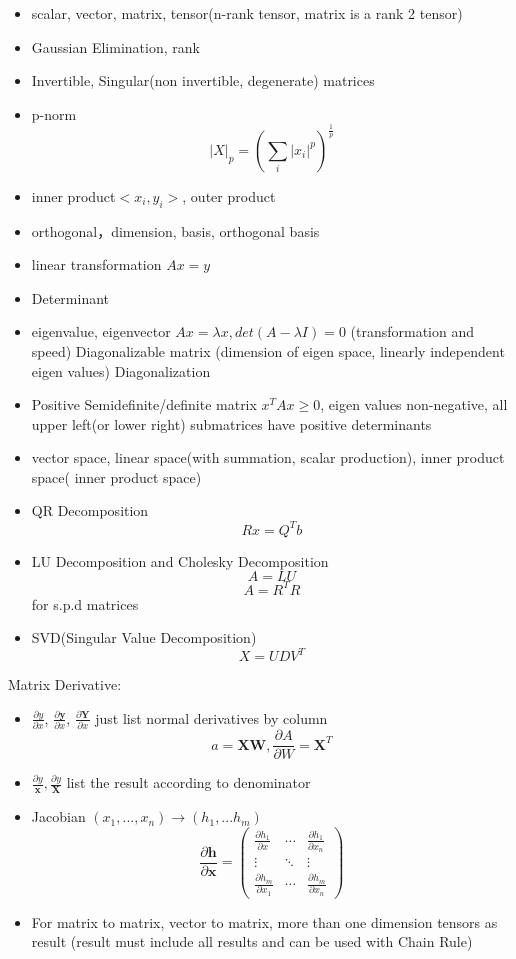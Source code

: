\documentclass[11pt, openany]{book}              %
\begin{document}
\begin{itemize}
    \item scalar, vector, matrix, tensor(n-rank tensor, matrix is a rank 2 tensor) 
    \item Gaussian Elimination, rank
    \item Invertible, Singular(non invertible, degenerate) matrices
    \item p-norm $$|X|_p = (\sum_i |x_i|^p)^{\frac{1}{p}}$$
    \item inner product$<x_i,y_i>$, outer product
    \item orthogonal，dimension, basis, orthogonal basis
    \item linear transformation $Ax = y$
    \item Determinant
    \item eigenvalue, eigenvector $Ax =\lambda x, det(A - \lambda I) = 0$ (transformation and speed)
    	\subitem Diagonalizable matrix (dimension of eigen space, linearly independent eigen values)
    	\subitem Diagonalization
    \item Positive Semidefinite/definite matrix
    	\subitem $x^TAx \geq 0$, eigen values non-negative, all upper left(or lower right) submatrices have positive determinants
    \item vector space, linear space(with summation, scalar production), inner product space( inner product space) 
    \item QR Decomposition $$ Rx = Q^Tb$$
    \item LU Decomposition and Cholesky Decomposition
    	\subitem $$A = LU$$
    	\subitem $$A = R^TR$$ for s.p.d matrices
     \item SVD(Singular Value Decomposition) 
     $$ X= UDV^T$$
\end{itemize}

Matrix Derivative:

\begin{itemize}
	\item $\frac{\partial y}{\partial x}$, $\frac{\partial \mathbf{y}}{\partial x}$, $\frac{\partial \mathbf{Y}}{\partial x}$ just list normal derivatives by column 
	$$a = \mathbf{XW}, \frac{\partial A}{\partial W} = \mathbf{X}^T$$
	\item $\frac{\partial y}{\mathbf{x}},\frac{\partial y}{\mathbf{X}}$ list the result according to denominator
	\item Jacobian $(x_1, ... , x_n) \rightarrow (h_1,...h_m)$
	$$\frac{\partial \mathbf{h}}{\partial \mathbf{x}} = 
	\begin{pmatrix} 
  				\frac{\partial h_1 }{\partial x} & \cdots & \frac{\partial h_1 }{\partial x_n}\\ 
  				\vdots & \ddots & \vdots \\
  				\frac{\partial{h_m}}{\partial x_1 } & \cdots & \frac{\partial h_m }{\partial x_n} 
			\end{pmatrix} $$
	\item For matrix to matrix, vector to matrix, more than one dimension tensors as result (result must include all results and can be used with Chain Rule)
\end{itemize}
\end{document}
